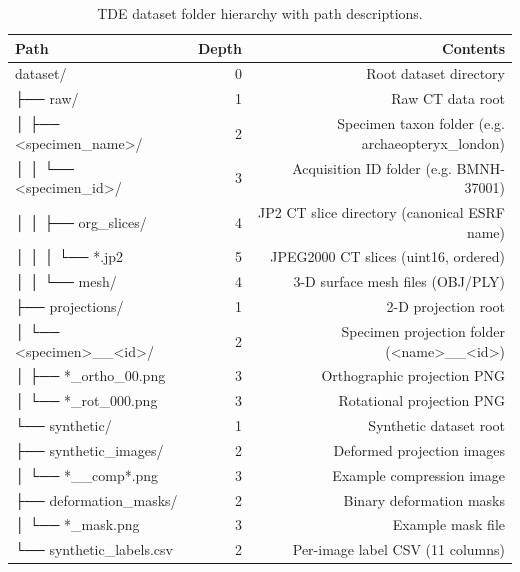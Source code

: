 \begin{table}[htbp]
\caption{TDE dataset folder hierarchy with path descriptions.}
\label{tab:folder_structure}
\begin{tabular}{lrr}
\toprule
Path & Depth & Contents \\
\midrule
dataset/ & 0 & Root dataset directory \\
├── raw/ & 1 & Raw CT data root \\
│   ├── <specimen\_name>/ & 2 & Specimen taxon folder (e.g. archaeopteryx\_london) \\
│   │   └── <specimen\_id>/ & 3 & Acquisition ID folder (e.g. BMNH-37001) \\
│   │       ├── org\_slices/ & 4 & JP2 CT slice directory (canonical ESRF name) \\
│   │       │   └── *.jp2 & 5 & JPEG2000 CT slices (uint16, ordered) \\
│   │       └── mesh/ & 4 & 3-D surface mesh files (OBJ/PLY) \\
├── projections/ & 1 & 2-D projection root \\
│   └── <specimen>\_\_<id>/ & 2 & Specimen projection folder (<name>\_\_<id>) \\
│       ├── *\_ortho\_00.png & 3 & Orthographic projection PNG \\
│       └── *\_rot\_000.png & 3 & Rotational projection PNG \\
└── synthetic/ & 1 & Synthetic dataset root \\
├── synthetic\_images/ & 2 & Deformed projection images \\
│   └── *\_\_comp*.png & 3 & Example compression image \\
├── deformation\_masks/ & 2 & Binary deformation masks \\
│   └── *\_mask.png & 3 & Example mask file \\
└── synthetic\_labels.csv & 2 & Per-image label CSV (11 columns) \\
\bottomrule
\end{tabular}
\end{table}
